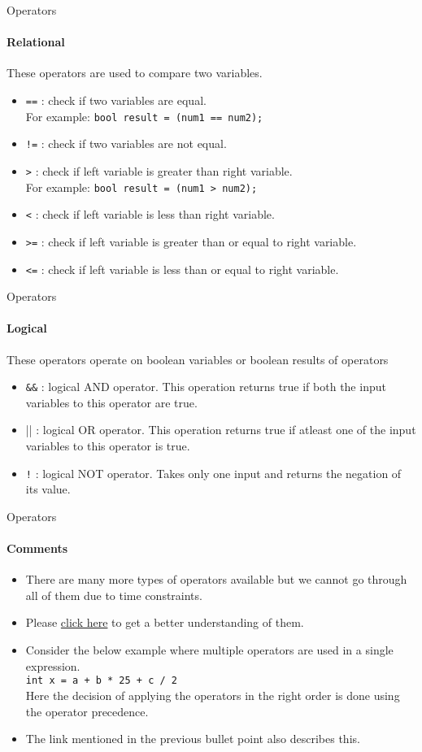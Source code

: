\documentclass[aspectratio=169]{beamer}
\begin{document}
\begin{frame}[fragile]{Operators}
	\framesubtitle{Relational}
	These operators are used to compare two variables.
	\begin{itemize}
		\item \verb|==| : check if two variables are equal. \\For example: \verb|bool result = (num1 == num2);|
		\item \verb|!=| : check if two variables are not equal.
		\item \verb|>| : check if left variable is greater than right variable.\\For example: \verb|bool result = (num1 > num2);|
		\item \verb|<| : check if left variable is less than right variable.
		\item \verb|>=| : check if left variable is greater than or equal to right variable.
		\item \verb|<=| : check if left variable is less than or equal to right variable.
	\end{itemize}
\end{frame}

\begin{frame}[fragile]{Operators}
	\framesubtitle{Logical}
	These operators operate on boolean variables or boolean results of operators
	\begin{itemize}
		\item \verb|&&| : logical AND operator. This operation returns true if both the input variables to this operator are true.
		\item || : logical OR operator. This operation returns true if atleast one of the input variables to this operator is true.
		\item \verb|!| : logical NOT operator. Takes only one input and returns the negation of its value.
	\end{itemize}
\end{frame}

\begin{frame}[fragile]{Operators}
	\framesubtitle{Comments}
	\begin{itemize}
		\item There are many more types of operators available but we cannot go through all of them due to time constraints.
		\item Please \href{https://www.tutorialspoint.com/cplusplus/cpp_operators.htm}{click here} to get a better understanding of them.
		\item Consider the below example where multiple operators are used in a single expression.\\ \verb|int x = a + b * 25 + c / 2| \\ Here the decision of applying the operators in the right order is done using the operator precedence.
		\item The link mentioned in the previous bullet point also describes this.
	\end{itemize}
\end{frame}
\end{document}
